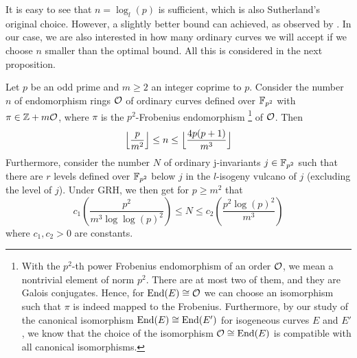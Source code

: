 It is easy to see that $n = \log_l(p)$ is sufficient, which is also Sutherland's original choice.
However, a slightly better bound can achieved, as observed by \cite{fp_supersingularity_tests}.
In our case, we are also interested in how many ordinary curves we will accept if we choose $n$ smaller than the optimal bound.
All this is considered in the next proposition.
\begin{theorem}
    Let $p$ be an odd prime and $m \geq 2$ an integer coprime to $p$.
    Consider the number $n$ of endomorphism rings $\mathcal{O}$ of ordinary curves defined over $\mathbb{F}_{p^2}$ with $\pi \in \mathbb{Z} + m\mathcal{O}$, where $\pi$ is the $p^2$-Frobenius endomorphism
    \footnote{
        With the $p^2$-th power Frobenius endomorphism of an order $\mathcal{O}$, we mean a nontrivial element of norm $p^2$.
        There are at most two of them, and they are Galois conjugates. 
        Hence, for $\mathrm{End}(E) \cong \mathcal{O}$ we can choose an isomorphism such that $\pi$ is indeed mapped to the Frobenius. 
        Furthermore, by our study of the canonical isomorphism $\mathrm{End}(E) \cong \mathrm{End}(E')$ for isogeneous curves $E$ and $E'$, we know that the choice of the isomorphism $\mathcal{O} \cong \mathrm{End}(E)$ is compatible with all canonical isomorphisms.}
    of $\mathcal{O}$.
    Then
    \begin{equation*}
        \Bigl\lfloor \frac p {m^2} \Bigr\rfloor \leq n \leq \Bigl\lfloor \frac {4p(p + 1)} {m^3} \Bigr\rfloor
    \end{equation*}
    Furthermore, consider the number $N$ of ordinary j-invariants $j \in \mathbb{F}_{p^2}$ such that there are $r$ levels defined over $\mathbb{F}_{p^2}$ below $j$ in the $l$-isogeny vulcano of $j$ (excluding the level of $j$).
    Under GRH, we then get for $p \geq m^2$ that
    \begin{equation*}
        c_1\left( \frac {p^2} {m^3 \log\log(p)^2} \right) \leq N \leq c_2\left( \frac {p^2\log(p)^2} {m^3} \right)
    \end{equation*}
    where $c_1, c_2 > 0$ are constants.
\end{theorem}
